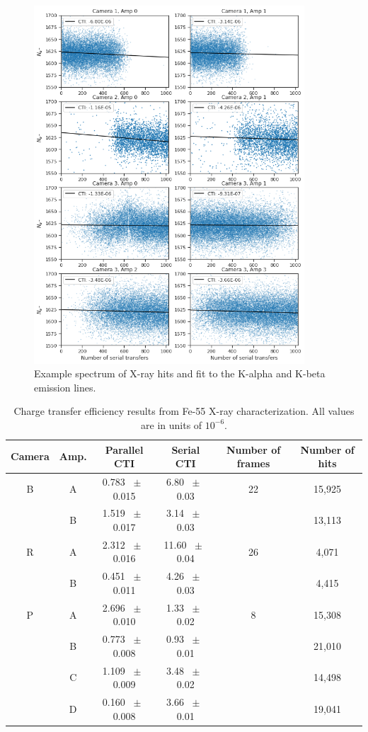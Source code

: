 \begin{figure}
    \centering
    \includegraphics[width=0.9\textwidth]{figures/cte/xray_cte_serial.png}
    \caption{Example spectrum of X-ray hits and fit to the K-alpha and K-beta emission lines.}
    \label{fig:cte_xray_serial}
\end{figure}

\begin{table}[]
    \centering
    \begin{tabular}{|c|c|c|c|c|c|}\hline
        Camera & Amp. & Parallel CTI & Serial CTI & Number of frames & Number of hits \\\hline
        B & A &0.783 $\;\pm\;$ 0.015 & 6.80 $\;\pm\;$ 0.03 & 22 & 15,925 \\
          & B &1.519 $\;\pm\;$ 0.017 & 3.14 $\;\pm\;$ 0.03 &    & 13,113 \\\hline
        R & A &2.312 $\;\pm\;$ 0.016 & 11.60 $\;\pm\;$ 0.04 & 26 & 4,071 \\
          & B &0.451 $\;\pm\;$ 0.011 & 4.26 $\;\pm\;$ 0.03 &    & 4,415 \\\hline
        P & A &2.696 $\;\pm\;$ 0.010 & 1.33 $\;\pm\;$ 0.02 & 8 & 15,308 \\
          & B &0.773 $\;\pm\;$ 0.008 & 0.93 $\;\pm\;$ 0.01 &   & 21,010 \\
          & C &1.109 $\;\pm\;$ 0.009 & 3.48 $\;\pm\;$ 0.02 &   & 14,498 \\
          & D &0.160 $\;\pm\;$ 0.008 & 3.66 $\;\pm\;$ 0.01 &   & 19,041 \\\hline
    \end{tabular}
    \caption{Charge transfer efficiency results from Fe-55 X-ray characterization. All values are in units of $10^{-6}$.}
    \label{tab:cte_xray}
\end{table}

